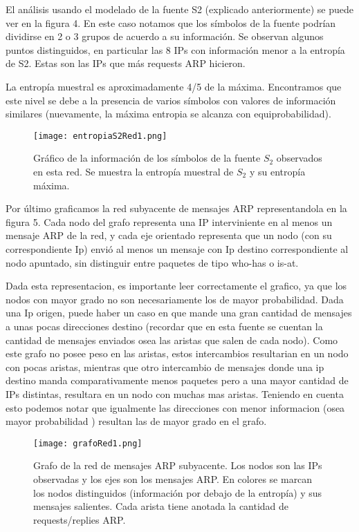 El análisis usando el modelado de la fuente S2 (explicado anteriormente) se puede ver en la figura 4. En este caso notamos que los símbolos de la fuente podrían dividirse en 2 o 3 grupos de acuerdo a su información. 
Se observan algunos puntos distinguidos, en particular las 8 IPs con información menor a la entropía de S2. Estas son las IPs que más requests ARP hicieron. 

La entropía muestral es aproximadamente 4/5 de la máxima. Encontramos que este nivel se debe a la presencia de varios símbolos con valores de información similares (nuevamente, la máxima entropia se alcanza con equiprobabilidad).

\begin{figure}[H]
\centering
\texttt{[image: entropiaS2Red1.png]}
\caption{Gráfico de la información de los símbolos de la fuente $S_2$ observados en esta red. Se muestra la entropía muestral de $S_2$ y su entropía máxima.}
\label{entropias2_1}
\end{figure}

Por último graficamos la red subyacente de mensajes ARP representandola en la figura 5. 
Cada nodo del grafo representa una IP interviniente en al menos un mensaje ARP de la red, y cada eje orientado representa que un nodo (con su correspondiente Ip) envió al menos un mensaje con Ip destino correspondiente al nodo apuntado, sin distinguir entre paquetes de tipo who-has o is-at.

Dada esta representacion, es importante leer correctamente el grafico, ya que los nodos con mayor grado no son necesariamente los de mayor probabilidad. 
Dada una Ip origen, puede haber un caso en que mande una gran cantidad de mensajes a unas pocas direcciones destino (recordar que en esta fuente se cuentan la cantidad de mensajes enviados osea las aristas que salen de cada nodo). 
Como este grafo no posee peso en las aristas, estos intercambios resultarian en un nodo con pocas aristas, mientras que otro intercambio de mensajes donde una ip destino manda comparativamente menos paquetes pero a una mayor cantidad de IPs distintas, resultara en un nodo con muchas mas aristas.
Teniendo en cuenta esto podemos notar que igualmente las direcciones con menor informacion (osea mayor probabilidad ) resultan las de mayor grado en el grafo.

\begin{figure}[H]
\centering
\texttt{[image: grafoRed1.png]}
\caption{Grafo de la red de mensajes ARP subyacente. Los nodos son las IPs observadas y los ejes son los mensajes ARP. En colores se marcan los nodos distinguidos (información por debajo de la entropía) y sus mensajes salientes. Cada arista tiene anotada la cantidad de requests/replies ARP.}
\label{grafo1}
\end{figure}